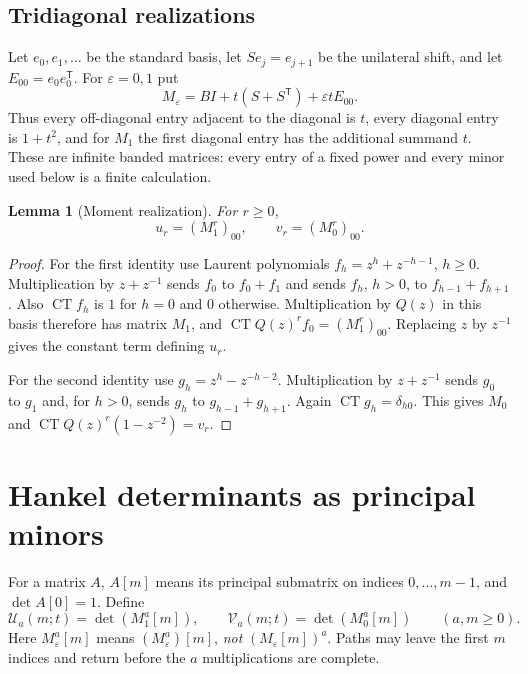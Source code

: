 \documentclass[11pt]{article}
\newtheorem{lemma}[theorem]{Lemma}
\theoremstyle{definition}
\theoremstyle{remark}
\newcommand{\CT}{\operatorname{CT}}
\newcommand{\U}{\mathcal U}
\newcommand{\V}{\mathcal V}
\newcommand{\eps}{\varepsilon}
\theoremstyle{definition}
\theoremstyle{plain}
\numberwithin{equation}{section}
\begin{document}
\subsection{Tridiagonal realizations}
Let $e_0,e_1,\ldots$ be the standard basis, let $S e_j=e_{j+1}$ be the
unilateral shift, and let $E_{00}=e_0e_0^{\mathsf T}$. For $\eps=0,1$ put
\begin{equation}
 M_\eps=B I+t(S+S^{\mathsf T})+\eps t E_{00}.
 \label{eq:M}
\end{equation}
Thus every off-diagonal entry adjacent to the diagonal is $t$, every
diagonal entry is $1+t^2$, and for $M_1$ the first diagonal entry has the
additional summand $t$. These are infinite banded matrices: every entry
of a fixed power and every minor used below is a finite calculation.

\begin{lemma}[Moment realization]
\label{lem:realization}
For $r\ge0$,
\begin{equation}
 u_r=(M_1^r)_{00},\qquad v_r=(M_0^r)_{00}.
 \label{eq:moment-M}
\end{equation}
\end{lemma}
\begin{proof}
For the first identity use Laurent polynomials
$f_h=z^h+z^{-h-1}$, $h\ge0$. Multiplication by $z+z^{-1}$ sends
$f_0$ to $f_0+f_1$ and sends $f_h$, $h>0$, to $f_{h-1}+f_{h+1}$.
Also $\CT f_h$ is $1$ for $h=0$ and $0$ otherwise. Multiplication by
$Q(z)$ in this basis therefore has matrix $M_1$, and
$\CT Q(z)^r f_0=(M_1^r)_{00}$. Replacing $z$ by $z^{-1}$ gives the
constant term defining $u_r$.

For the second identity use $g_h=z^h-z^{-h-2}$. Multiplication by
$z+z^{-1}$ sends $g_0$ to $g_1$ and, for $h>0$, sends $g_h$ to
$g_{h-1}+g_{h+1}$. Again $\CT g_h=\delta_{h0}$. This gives $M_0$ and
$\CT Q(z)^r(1-z^{-2})=v_r$.
\end{proof}

\section{Hankel determinants as principal minors}
\label{sec:gram}

For a matrix $A$, $A[m]$ means its principal submatrix on indices
$0,\ldots,m-1$, and $\det A[0]=1$. Define
\begin{equation}
 \U_a(m;t)=\det(M_1^a[m]),\qquad
 \V_a(m;t)=\det(M_0^a[m])\qquad(a,m\ge0).
 \label{eq:UV}
\end{equation}
Here $M_\eps^a[m]$ means $(M_\eps^a)[m]$, \emph{not}
$(M_\eps[m])^a$. Paths may leave the first $m$ indices and return before
the $a$ multiplications are complete.
\end{document}
